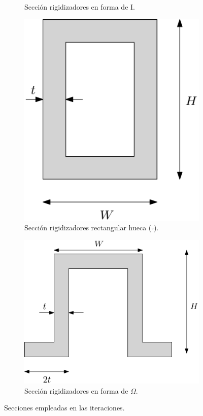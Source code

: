 \begin{figure}[H]
\begin{subfigure}[b]{0.5\linewidth}
    \caption{Sección rigidizadores  en forma de I.}
  \end{subfigure} 
  \begin{subfigure}[b]{0.5\linewidth}
  \centering
    \includegraphics[scale = 0.25]{Figures/SeccCuadradoHueco.png} 
    \caption{Sección rigidizadores  rectangular hueca ($\square$).}
  \end{subfigure}
  \hfill
  \begin{subfigure}[b]{0.5\linewidth}
  \centering
    \includegraphics[scale = 0.2]{Figures/Omega.png} 
    \caption{Sección rigidizadores  en forma de $\Omega$.}
  \end{subfigure} 
 \caption{Secciones empleadas en las iteraciones.}
 \label{fig:Secciones} 
\end{figure}

